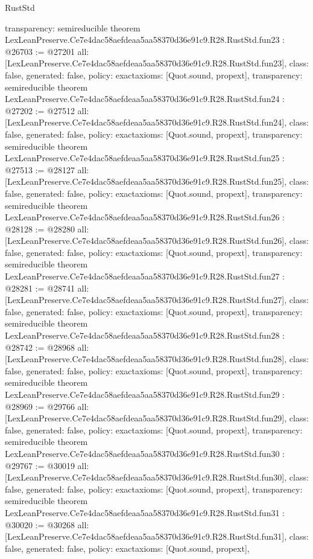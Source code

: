 \begin{lexlean}{RustStd}
\begin{coremodule}
{  transparency: semireducible
}
theorem LexLeanPreserve.Ce7e4dac58aefdeaa5aa58370d36e91c9.R28.RustStd.fun23 : @26703 := @27201 {
  all: [LexLeanPreserve.Ce7e4dac58aefdeaa5aa58370d36e91c9.R28.RustStd.fun23],
  class: false,
  generated: false,
  policy: exact{axioms: [Quot.sound, propext]},
  transparency: semireducible
}
theorem LexLeanPreserve.Ce7e4dac58aefdeaa5aa58370d36e91c9.R28.RustStd.fun24 : @27202 := @27512 {
  all: [LexLeanPreserve.Ce7e4dac58aefdeaa5aa58370d36e91c9.R28.RustStd.fun24],
  class: false,
  generated: false,
  policy: exact{axioms: [Quot.sound, propext]},
  transparency: semireducible
}
theorem LexLeanPreserve.Ce7e4dac58aefdeaa5aa58370d36e91c9.R28.RustStd.fun25 : @27513 := @28127 {
  all: [LexLeanPreserve.Ce7e4dac58aefdeaa5aa58370d36e91c9.R28.RustStd.fun25],
  class: false,
  generated: false,
  policy: exact{axioms: [Quot.sound, propext]},
  transparency: semireducible
}
theorem LexLeanPreserve.Ce7e4dac58aefdeaa5aa58370d36e91c9.R28.RustStd.fun26 : @28128 := @28280 {
  all: [LexLeanPreserve.Ce7e4dac58aefdeaa5aa58370d36e91c9.R28.RustStd.fun26],
  class: false,
  generated: false,
  policy: exact{axioms: [Quot.sound, propext]},
  transparency: semireducible
}
theorem LexLeanPreserve.Ce7e4dac58aefdeaa5aa58370d36e91c9.R28.RustStd.fun27 : @28281 := @28741 {
  all: [LexLeanPreserve.Ce7e4dac58aefdeaa5aa58370d36e91c9.R28.RustStd.fun27],
  class: false,
  generated: false,
  policy: exact{axioms: [Quot.sound, propext]},
  transparency: semireducible
}
theorem LexLeanPreserve.Ce7e4dac58aefdeaa5aa58370d36e91c9.R28.RustStd.fun28 : @28742 := @28968 {
  all: [LexLeanPreserve.Ce7e4dac58aefdeaa5aa58370d36e91c9.R28.RustStd.fun28],
  class: false,
  generated: false,
  policy: exact{axioms: [Quot.sound, propext]},
  transparency: semireducible
}
theorem LexLeanPreserve.Ce7e4dac58aefdeaa5aa58370d36e91c9.R28.RustStd.fun29 : @28969 := @29766 {
  all: [LexLeanPreserve.Ce7e4dac58aefdeaa5aa58370d36e91c9.R28.RustStd.fun29],
  class: false,
  generated: false,
  policy: exact{axioms: [Quot.sound, propext]},
  transparency: semireducible
}
theorem LexLeanPreserve.Ce7e4dac58aefdeaa5aa58370d36e91c9.R28.RustStd.fun30 : @29767 := @30019 {
  all: [LexLeanPreserve.Ce7e4dac58aefdeaa5aa58370d36e91c9.R28.RustStd.fun30],
  class: false,
  generated: false,
  policy: exact{axioms: [Quot.sound, propext]},
  transparency: semireducible
}
theorem LexLeanPreserve.Ce7e4dac58aefdeaa5aa58370d36e91c9.R28.RustStd.fun31 : @30020 := @30268 {
  all: [LexLeanPreserve.Ce7e4dac58aefdeaa5aa58370d36e91c9.R28.RustStd.fun31],
  class: false,
  generated: false,
  policy: exact{axioms: [Quot.sound, propext]},
}
\end{coremodule}
\end{lexlean}
